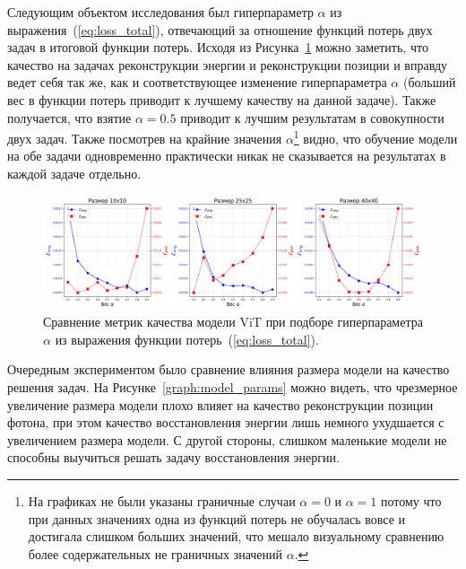 \documentclass[a4paper,12pt]{extarticle}
\begin{document}
Следующим объектом исследования был гиперпараметр $\alpha$ из выражения~(\ref{eq:loss_total}), отвечающий за отношение функций потерь двух задач в итоговой функции потерь. Исходя из Рисунка~\ref{graph:alpha} можно заметить, что качество на задачах реконструкции энергии и реконструкции позиции и вправду ведет себя так же, как и соответствующее изменение гиперпараметра $\alpha$ (больший вес в функции потерь приводит к лучшему качеству на данной задаче). Также получается, что взятие $\alpha = 0.5$ приводит к лучшим результатам в совокупности двух задач. Также посмотрев на крайние значения $\alpha$\footnote{На графиках не были указаны граничные случаи $\alpha = 0$ и $\alpha = 1$ потому что при данных значениях одна из функций потерь не обучалась вовсе и достигала слишком больших значений, что мешало визуальному сравнению более содержательных не граничных значений $\alpha$.} видно, что обучение модели на обе задачи одновременно практически никак не сказывается на результатах в каждой задаче отдельно.

\begin{figure}[t]
    \centering
    \includegraphics[width=1.0\textwidth]{graphics/exp3_alpha.png}
    \caption{Сравнение метрик качества модели \textsf{ViT} при подборе гиперпараметра $\alpha$ из выражения функции потерь~(\ref{eq:loss_total}).}
    \label{graph:alpha}
\end{figure}

Очередным экспериментом было сравнение влияния размера модели на качество решения задач. На Рисунке~\ref{graph:model_params} можно видеть, что чрезмерное увеличение размера модели плохо влияет на качество реконструкции позиции фотона, при этом качество восстановления энергии лишь немного ухудшается с увеличением размера модели. С другой стороны, слишком маленькие модели не способны выучиться решать задачу восстановления энергии.
\end{document}
